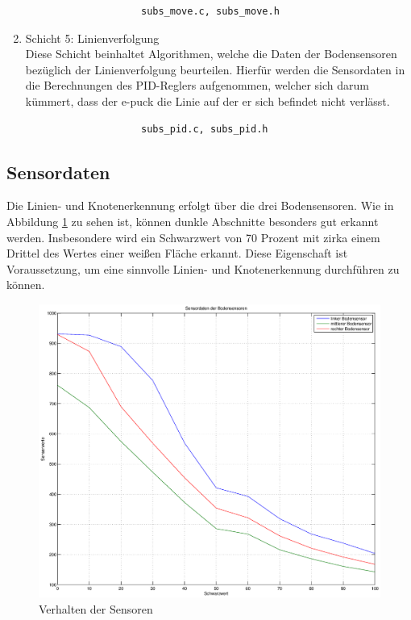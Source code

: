 \documentclass[10pt,a4paper]{article}
\begin{document}
\begin{enumerate}
					\begin{verbatim}  
					subs_move.c, subs_move.h
					\end{verbatim}

  				\item Schicht 5: Linienverfolgung \\
					Diese Schicht beinhaltet Algorithmen, welche die Daten der Bodensensoren bezüglich  der Linienverfolgung beurteilen. Hierfür werden die
					Sensordaten in die Berechnungen des PID-Reglers aufgenommen, welcher sich darum kümmert, 	dass der e-puck die Linie auf der er sich
					befindet nicht verlässt.

					\begin{verbatim}
					subs_pid.c, subs_pid.h
					\end{verbatim}

  			\end{enumerate}
  		
 		\subsection{Sensordaten}
			Die Linien- und Knotenerkennung erfolgt über die drei Bodensensoren. Wie in Abbildung \ref{fig:auswertung} zu sehen ist,
			können dunkle Abschnitte besonders gut erkannt werden. Insbesondere wird ein Schwarzwert von 70 Prozent mit zirka einem
			Drittel des Wertes einer weißen Fläche erkannt. Diese Eigenschaft ist Voraussetzung, um eine sinnvolle Linien- und
			Knotenerkennung durchführen zu können.
			\begin{figure}[h]
				\centering
				\includegraphics[width=15cm]{images/sensorgrafik.eps}
				\caption{Verhalten der Sensoren}		
				\label{fig:auswertung}	
			\end{figure}
\end{document}
